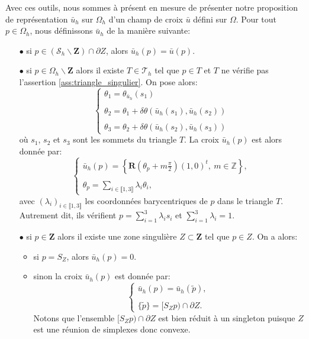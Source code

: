 Avec ces outils, nous sommes à présent en mesure de présenter notre proposition de représentation $\bar{u}_h$ sur $\Omega_h$ d'un champ de croix $\bar{u}$ défini sur $\Omega$. Pour tout $p\in\Omega_h$, nous définissons $\bar{u}_h$ de la manière suivante:\\

\begin{itemize}
\item[$\bullet$] si $p\in(\mathcal{S}_h\backslash\mathbf{Z})\cap\partial Z$, alors $\bar{u}_h(p)=\bar{u}(p)$.\\%
\item[$\bullet$] si $p\in\Omega_h\backslash\mathbf{Z}$ alors il existe $T\in\mathcal{T}_h$ tel que $p\in T$ et $T$ ne vérifie pas l'assertion \ref{ass:triangle_singulier}. On pose alors:
$$
\left\{
\begin{array}{l}
\theta_1 = \theta_{\bar{u}_h}(s_1)\\\\
\theta_2 = \theta_1 + \delta\theta(\bar{u}_h(s_1),\bar{u}_h(s_2))\\\\
\theta_3 = \theta_2 + \delta\theta(\bar{u}_h(s_2),\bar{u}_h(s_3))
\end{array}
\right.
$$
où $s_1$, $s_2$ et $s_3$ sont les sommets du triangle $T$. La croix $\bar{u}_h(p)$ est alors donnée par:
$$
\left\{
\begin{array}{l}
\bar{u}_h(p)=\displaystyle\left\{\mathbf{R}\left(\theta_p+m\frac{\pi}{2}\right)(1,0)^t,~m\in\mathbb{Z}\right\},\\\\
\theta_p=\displaystyle\sum_{i\in\llbracket1, 3\rrbracket}\lambda_i\theta_i,
\end{array}
\right.
$$
avec $(\lambda_i)_{i\in\llbracket 1, 3\rrbracket}$ les coordonnées barycentriques de $p$ dans le triangle $T$. Autrement dit, ils vérifient $p=\sum_{i=1}^3\lambda_i s_i$ et $\sum_{i=1}^3\lambda_i=1$.\\
\item[$\bullet$] si $p\in\mathbf{Z}$ alors il existe une zone singulière $Z\subset\mathbf{Z}$ tel que $p\in Z$. On a alors:\\
\begin{itemize}
 \item si $p=S_Z$, alors $\bar{u}_h(p)=0$.\\
 \item sinon la croix $\bar{u}_h(p)$ est donnée par:
$$
\left\{
\begin{array}{l}
\bar{u}_h(p)=\bar{u}_h(\widetilde{p}),\\\\
\{\widetilde{p}\}=[S_Zp)\cap\partial Z.
\end{array}
\right.
$$
Notons que l'ensemble $[S_Zp)\cap\partial Z$ est bien réduit à un singleton puisque $Z$ est une réunion de simplexes donc convexe.\\
\end{itemize}
\end{itemize}

